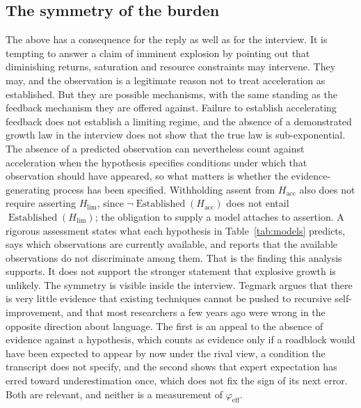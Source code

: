 \documentclass[11pt]{article}
\begin{document}
\subsection{The symmetry of the burden}

The above has a consequence for the reply as well as for the interview. It is tempting to answer a claim of imminent explosion by pointing out that diminishing returns, saturation and resource constraints may intervene. They may, and the observation is a legitimate reason not to treat acceleration as established. But they are possible mechanisms, with the same standing as the feedback mechanism they are offered against. Failure to establish accelerating feedback does not establish a limiting regime, and the absence of a demonstrated growth law in the interview does not show that the true law is sub-exponential. The absence of a predicted observation can nevertheless count against acceleration when the hypothesis specifies conditions under which that observation should have appeared, so what matters is whether the evidence-generating process has been specified. Withholding assent from $H_{\mathrm{acc}}$ also does not require asserting $H_{\mathrm{lim}}$, since $\neg\operatorname{Established}(H_{\mathrm{acc}})$ does not entail $\operatorname{Established}(H_{\mathrm{lim}})$; the obligation to supply a model attaches to assertion. A rigorous assessment states what each hypothesis in Table~\ref{tab:models} predicts, says which observations are currently available, and reports that the available observations do not discriminate among them. That is the finding this analysis supports. It does not support the stronger statement that explosive growth is unlikely. The symmetry is visible inside the interview. Tegmark argues that there is very little evidence that existing techniques cannot be pushed to recursive self-improvement, and that most researchers a few years ago were wrong in the opposite direction about language. The first is an appeal to the absence of evidence against a hypothesis, which counts as evidence only if a roadblock would have been expected to appear by now under the rival view, a condition the transcript does not specify, and the second shows that expert expectation has erred toward underestimation once, which does not fix the sign of its next error. Both are relevant, and neither is a measurement of $\varphi_{\mathrm{eff}}$.
\end{document}
